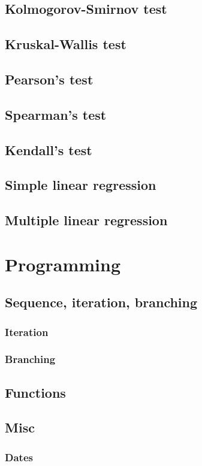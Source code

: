 \documentclass{report}
\begin{document}
	\section{Kolmogorov-Smirnov test}
	\section{Kruskal-Wallis test}
	\section{Pearson’s test}
	\section{Spearman’s test}
	\section{Kendall’s test}
	\section{Simple linear regression}
	\section{Multiple linear regression}

\chapter{Programming}
	\section{Sequence, iteration, branching}
		\subsection{Iteration}\label{subsec:iteration}
		\subsection{Branching}\label{subsec:branching}
	\section{Functions}
	\section{Misc}
		\subsection{Dates}\label{subsec:dates}
\end{document}

